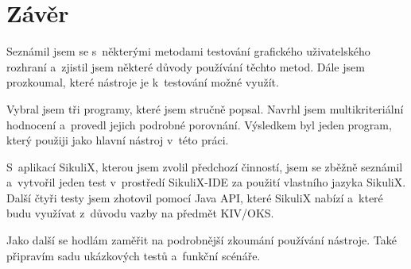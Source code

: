 \documentclass{bakalarka}
\begin{document}
\chapter{Závěr}
Seznámil jsem se s~některými metodami testování grafického uživatelského rozhraní a~zjistil jsem některé důvody používání těchto metod. Dále jsem prozkoumal, které nástroje je k~testování možné využít.

Vybral jsem tři programy, které jsem stručně popsal. Navrhl jsem multikriteriální hodnocení a~provedl jejich podrobné porovnání. Výsledkem byl jeden program, který použiji jako hlavní nástroj v~této práci.

S~aplikací SikuliX, kterou jsem zvolil předchozí činností, jsem se zběžně seznámil a~vytvořil jeden test v~prostředí SikuliX-IDE za použití vlastního jazyka SikuliX. Další čtyři testy jsem zhotovil pomocí Java API, které SikuliX nabízí a~které budu využívat z~důvodu vazby na předmět KIV/OKS.

Jako další se hodlám zaměřit na podrobnější zkoumání používání nástroje. Také připravím sadu ukázkových testů a~funkční scénáře.
		
\appendix


\end{document}
